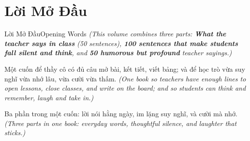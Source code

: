 \chapter*{Lời Mở Đầu}

\begin{truyen}{Lời Mở Đầu}{Opening Words}
\textit{(This volume combines three parts: \textbf{What the teacher says in class} (50 sentences), \textbf{100 sentences that make students fall silent and think}, and \textbf{50 humorous but profound} teacher sayings.)}

Một cuốn để thầy cô có đủ câu mở bài, kết tiết, viết bảng; và để học trò vừa suy nghĩ vừa nhớ lâu, vừa cười vừa thấm.
\textit{(One book so teachers have enough lines to open lessons, close classes, and write on the board; and so students can think and remember, laugh and take in.)}
\end{truyen}

\begin{baihoc}
Ba phần trong một cuốn: lời nói hằng ngày, im lặng suy nghĩ, và cười mà nhớ.
\textit{(Three parts in one book: everyday words, thoughtful silence, and laughter that sticks.)}
\end{baihoc}
\ngancach
